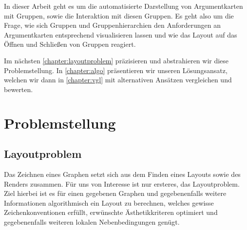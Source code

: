 In dieser Arbeit geht es um die automatisierte Darstellung von Argumentkarten mit Gruppen, sowie die Interaktion mit diesen Gruppen. 
Es geht also um die Frage, wie sich Gruppen und Gruppenhierarchien den Anforderungen an Argumentkarten entsprechend visualisieren lassen 
und wie das Layout auf das Öffnen und Schließen von Gruppen reagiert.

Im nächsten \autoref{chapter:layoutproblem}  präzisieren und abstrahieren wir diese Problemstellung. 
In \autoref{chapter:algo} präsentieren wir unseren Lösungsansatz, welchen wir dann in \autoref{chapter:vgl} mit alternativen Ansätzen vergleichen und bewerten.



\chapter{Problemstellung}%
\label{chapter:layoutproblem}

\section{Layoutproblem}
\label{sec:layoutproblem}
Das Zeichnen eines Graphen setzt sich aus dem Finden eines Layouts sowie des Renders zusammen. 
Für uns von Interesse ist nur ersteres, das Layoutproblem. 
Ziel hierbei ist es für einen gegebenen Graphen und gegebenenfalls weitere Informationen algorithmisch ein Layout zu berechnen,
welches gewisse Zeichenkonventionen erfüllt, erwünschte Ästhetikkriteren optimiert und gegebenenfalls weiteren lokalen Nebenbedingungen genügt.


